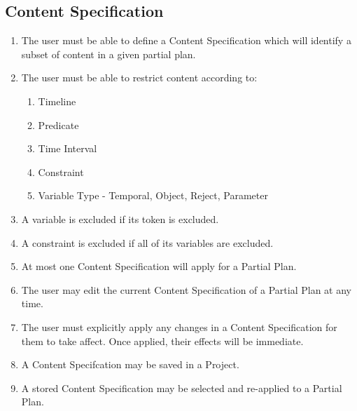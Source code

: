 \documentclass[twoside, 11pt]{article}
\begin{document}
\subsection{Content Specification}
\begin{enumerate}
\item The user must be able to define a Content Specification which will identify a subset of content in a given partial plan.
\item The user must be able to restrict content according to:
\begin{enumerate}
\item Timeline
\item Predicate
\item Time Interval
\item Constraint
\item Variable Type - Temporal, Object, Reject, Parameter
\end{enumerate}
\item A variable is excluded if its token is excluded.
\item A constraint is excluded if all of its variables are excluded.
\item At most one Content Specification will apply for a Partial Plan.
\item The user may edit the current Content Specification of a Partial Plan at any time.
\item The user must explicitly apply any changes in a Content Specification for them to take affect. Once applied, their effects will be immediate.
\item A Content Specifcation may be saved in a Project.
\item A stored Content Specification may be selected and re-applied to a Partial Plan.
\end{enumerate}
\end{document}
